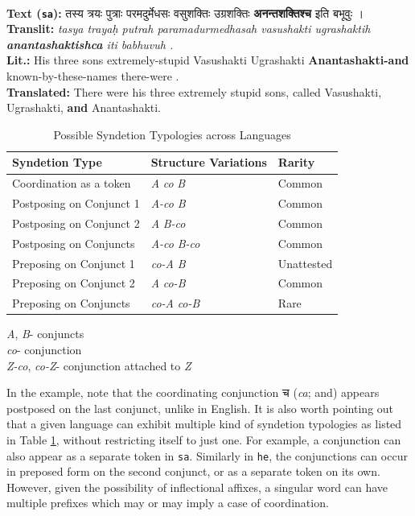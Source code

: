 \begin{example}
\label{examp:conj_sa}
\textbf{ }\\
\textbf{Text (\texttt{sa}):} \texthindi{तस्य त्रयः पुत्राः परमदुर्मेधसः वसुशक्तिः उग्रशक्तिः \textbf{अनन्तशक्तिश्च} इति बभूवुः ।} \\
\textbf{Translit:} \textit{tasya trayaḥ putrah paramadurmedhasah vasushakti ugrashaktih \textbf{anantashaktishca} iti babhuvuh .}\\
\textbf{Lit.:} His three sons extremely-stupid Vasushakti Ugrashakti \textbf{Anantashakti-and} known-by-these-names there-were .\\
\textbf{Translated:} There were his three extremely stupid sons, called Vasushakti, Ugrashakti, \textbf{and} Anantashakti.
\end{example}

\begin{table}[H]
    \centering
    \begin{tabular}{|l|l|l|}
    \hline
    \textbf{Syndetion Type} & \textbf{Structure Variations} & \textbf{Rarity}\\
    \hline
    Coordination as a token & \textit{A} \textit{co} \textit{B} & Common\\
    Postposing on Conjunct 1 & \textit{A-co} \textit{B} & Common\\
    Postposing on Conjunct 2 & \textit{A} \textit{B-co} & Common\\
    Postposing on Conjuncts & \textit{A-co} \textit{B-co} & Common\\
    Preposing on Conjunct 1 & \textit{co-A} \textit{B} & Unattested\\
    Preposing on Conjunct 2 & \textit{A} \textit{co-B} & Common\\
    Preposing on Conjuncts & \textit{co-A} \textit{co-B} & Rare\\
    \hline
    \end{tabular}
    \caption{Possible Syndetion Typologies across Languages}
    \textit{A}, \textit{B}- conjuncts\\
    \textit{co}- conjunction\\
    \textit{Z-co}, \textit{co-Z}- conjunction attached to \textit{Z}\\
    \label{tab:syndetion}
\end{table}

In the example, note that the coordinating conjunction \texthindi{च} (\textit{ca}; and) appears postposed on the last conjunct, unlike in English. It is also worth pointing out that a given language can exhibit multiple kind of syndetion typologies as listed in Table \ref{tab:syndetion}, without restricting itself to just one. For example, a conjunction can also appear as a separate token in \verb|sa|. Similarly in \verb|he|, the conjunctions can occur in preposed form on the second conjunct, or as a separate token on its own. However, given the possibility of inflectional affixes, a singular word can have multiple prefixes which may or may imply a case of coordination.

